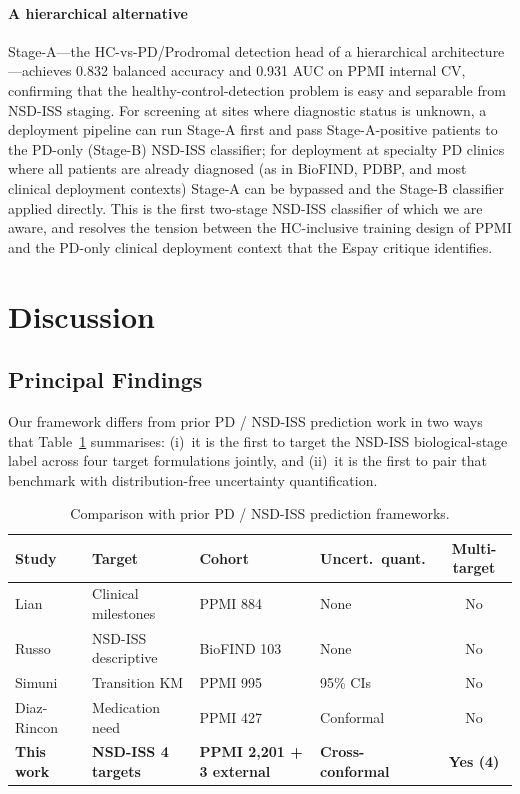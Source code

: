\paragraph*{A hierarchical alternative} Stage-A---the HC-vs-PD/Prodromal detection head of a hierarchical architecture---achieves 0.832 balanced accuracy and 0.931 AUC on PPMI internal CV, confirming that the healthy-control-detection problem is easy and separable from NSD-ISS staging. For screening at sites where diagnostic status is unknown, a deployment pipeline can run Stage-A first and pass Stage-A-positive patients to the PD-only (Stage-B) NSD-ISS classifier; for deployment at specialty PD clinics where all patients are already diagnosed (as in BioFIND, PDBP, and most clinical deployment contexts) Stage-A can be bypassed and the Stage-B classifier applied directly. This is the first two-stage NSD-ISS classifier of which we are aware, and resolves the tension between the HC-inclusive training design of PPMI and the PD-only clinical deployment context that the Espay critique identifies.

\section{Discussion}
\label{p1:sec:discussion}

\subsection{Principal Findings}
Our framework differs from prior PD / NSD-ISS prediction work in two ways that Table~\ref{p1:tab:competitors} summarises: (i)~it is the first to target the NSD-ISS biological-stage label across four target formulations jointly, and (ii)~it is the first to pair that benchmark with distribution-free uncertainty quantification.

\begin{table}[!t]
\centering
\caption{Comparison with prior PD / NSD-ISS prediction frameworks.}
\label{p1:tab:competitors}
\scriptsize
\setlength{\tabcolsep}{3pt}
\begin{tabular}{@{}p{1.8cm}p{1.4cm}p{1.6cm}p{1.3cm}c@{}}
\toprule
Study & Target & Cohort & Uncert.\ quant. & Multi-target \\
\midrule
Lian~\cite{adamedgraph} & Clinical milestones & PPMI 884 & None & No \\
Russo~\cite{russo2025} & NSD-ISS descriptive & BioFIND 103 & None & No \\
Simuni~\cite{simuni2025} & Transition KM & PPMI 995 & 95\% CIs & No \\
Diaz-Rincon~\cite{diazrincon2025} & Medication need & PPMI 427 & Conformal & No \\
\textbf{This work} & \textbf{NSD-ISS 4 targets} & \textbf{PPMI 2{,}201 + 3 external} & \textbf{Cross-conformal} & \textbf{Yes (4)} \\
\bottomrule
\end{tabular}
\end{table}

